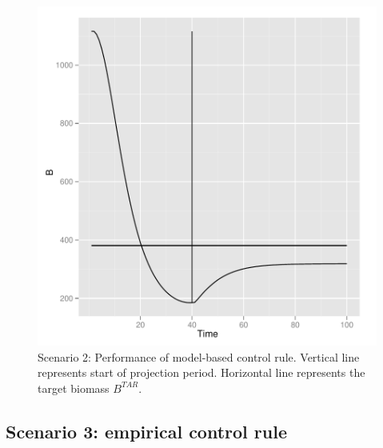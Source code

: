 \documentclass[a4paper]{article}
\begin{document}
\begin{figure}
\centering
\includegraphics{script-hcr_plot_sc2}
\caption{Scenario 2: Performance of model-based control rule. Vertical line represents start of projection period. 
Horizontal line represents the target biomass $B^{TAR}$.}
\label{fig:hcr_proj_biomass_sc2}
\end{figure}


\subsection{Scenario 3: empirical control rule}
\end{document}
